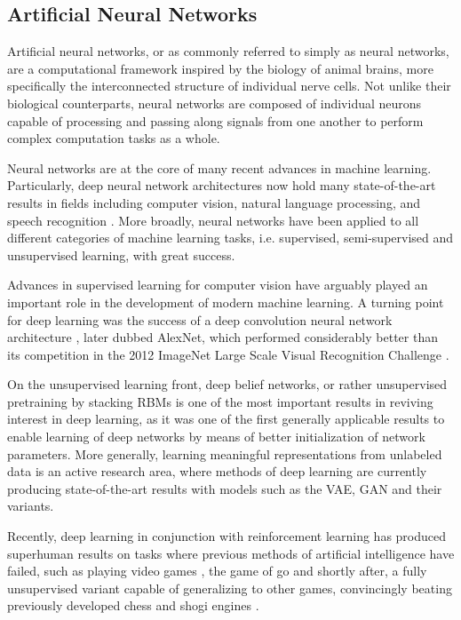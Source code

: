 \subsection{Artificial Neural Networks}
\label{section:artificial_neural_networks}

Artificial neural networks, or as commonly referred to simply as neural networks, are a computational framework inspired by the biology of animal brains, more specifically the interconnected structure of individual nerve cells. Not unlike their biological counterparts, neural networks are composed of individual neurons capable of processing and passing along signals from one another to perform complex computation tasks as a whole.

Neural networks are at the core of many recent advances in machine learning. Particularly, deep neural network architectures now hold many state-of-the-art results in fields including computer vision, natural language processing, and speech recognition \cite{deep_learning}. More broadly, neural networks have been applied to all different categories of machine learning tasks, i.e. supervised, semi-supervised and unsupervised learning, with great success.

Advances in supervised learning for computer vision have arguably played an important role in the development of modern machine learning. A turning point for deep learning was the success of a deep convolution neural network architecture \cite{imagenet_alexnet}, later dubbed AlexNet, which performed considerably better than its competition in the 2012 ImageNet Large Scale Visual Recognition Challenge \cite{imagenet, imagenet_challenge}.

On the unsupervised learning front, deep belief networks, or rather unsupervised pretraining by stacking RBMs is one of the most important results in reviving interest in deep learning, as it was one of the first generally applicable results to enable learning of deep networks by means of better initialization of network parameters. More generally, learning meaningful representations from unlabeled data is an active research area, where methods of deep learning are currently producing state-of-the-art results with models such as the VAE, GAN and their variants.

Recently, deep learning in conjunction with reinforcement learning has produced superhuman results on tasks where previous methods of artificial intelligence have failed, such as playing video games \cite{deep_atari}, the game of go \cite{alphago} and shortly after, a fully unsupervised variant capable of generalizing to other games, convincingly beating previously developed chess and shogi engines \cite{alphazero, alphazero_generalized}.

